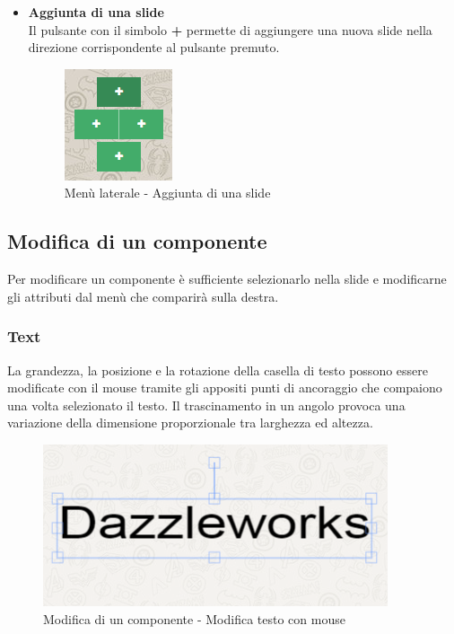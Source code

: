 \begin{itemize}
 
 
\item \textbf{Aggiunta di una \gls{slide}}\\
 Il pulsante con il simbolo \textbf{+} permette di aggiungere una nuova \gls{slide} nella direzione corrispondente al pulsante premuto.
 \begin{figure}[h] 
 	\centering 
 	\includegraphics[scale=0.80] {img/editor_add.png}
 	\caption{Menù laterale - Aggiunta di una slide} 
 \end{figure}

\end{itemize}


\newpage

\subsection{Modifica di un componente}
Per modificare un componente è sufficiente selezionarlo nella \gls{slide} e modificarne gli attributi dal menù che comparirà sulla destra.

\subsubsection{Text}
La grandezza, la posizione e la rotazione della casella di testo possono essere modificate con il mouse tramite gli appositi punti di ancoraggio che compaiono una volta selezionato il testo. Il trascinamento in un angolo provoca una variazione della dimensione proporzionale tra larghezza ed altezza.

\begin{figure}[H] 
	\centering 
	\includegraphics[scale=0.80] {img/text_anchor.png}
	\caption{Modifica di un componente - Modifica testo con mouse} 
\end{figure}

